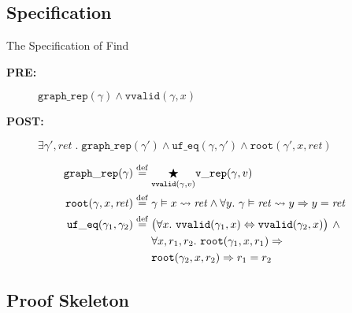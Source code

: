 \documentclass[professionalfonts, xcolor=table]{beamer}
\newcommand{\defeq}{\mathbin{\overset{\mathrm{def}}{=}}}
\begin{document}
\subsection{Specification}
\begin{frame}{The Specification of Find}
  \centering
  \colorbox{lightg}{\parbox{.9\textwidth}{
      \begin{description}
      \item[{\bf PRE:}] $\mathtt{graph\_rep}(\gamma) \wedge \mathtt{vvalid}(\gamma, x)$
      \item[{\bf POST:}] $\exists \gamma', \mathit{ret}\;\text{.}\;\mathtt{graph\_rep}(\gamma')\wedge\mathtt{uf\_eq}(\gamma, \gamma') \wedge \mathtt{root}(\gamma', x, \mathit{ret})$
  \end{description}}}
  \pause
  \vskip10pt
  \colorbox{lightg}{\parbox{.9\textwidth}{
      \begin{align*}
        \mathtt{graph\_rep}(\gamma)\;\defeq\; &
        \underset{\mathtt{vvalid}(\gamma, v)}{\bigstar}\mathtt{v\_rep}(\gamma, v)\\
        \mathtt{root}(\gamma, x, \mathit{ret}) \;\defeq\; &\gamma \vDash x \leadsto \mathit{ret} \wedge
        \forall y.~ \gamma \vDash \mathit{ret} \leadsto y \Rightarrow y = \mathit{ret}\\
        \mathtt{uf\_eq}(\gamma_1, \gamma_2)\; \defeq\; &\big(\forall x.~
        \mathtt{vvalid}(\gamma_1, x)\Leftrightarrow \mathtt{vvalid}(\gamma_2,x)\big)
        \, \wedge\, \null\\
        & \forall x, r_1, r_2.~ \mathtt{root}(\gamma_1, x, r_1) \Rightarrow\\
        &\mathtt{root}(\gamma_2, x, r_2) \Rightarrow r_1 = r_2
      \end{align*}
    }}
\end{frame}

\subsection{Proof Skeleton}
\end{document}
